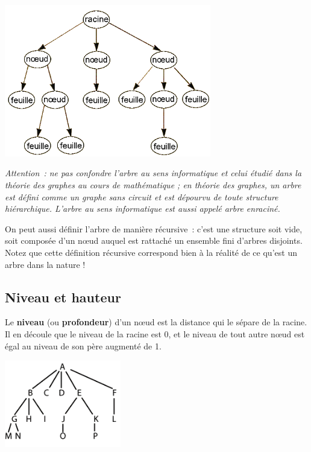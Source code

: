 		\begin{center}
		\includegraphics[width=9.036cm,height=6.636cm]{image/a2012Logique2eme-img029.png} 
		\end{center}
		
		\textit{Attention~: ne pas confondre l'arbre au sens informatique 
		et celui étudié dans la théorie des graphes au cours de mathématique ; 
		en théorie des graphes, un arbre est défini comme un graphe sans 
		circuit et est dépourvu de toute structure hiérarchique. L'arbre au sens
		informatique est aussi appelé arbre enraciné.}

		On peut aussi définir l'arbre de manière récursive~: 
		c'est une structure soit vide, soit composée d'un n{\oe}ud auquel
		est rattaché un ensemble fini d'arbres disjoints. 
		Notez que cette définition récursive correspond bien à la réalité de
		ce qu'est un arbre dans la nature !

	\subsection{Niveau et hauteur}

		Le \textbf{niveau} (ou \textbf{profondeur}) d'un n{\oe}ud 
		est la distance qui le sépare de la racine. Il en découle que
		le niveau de la racine est 0, et le niveau de tout autre 
		n{\oe}ud est égal au niveau de son père augmenté de 1.

		\begin{center}
		\includegraphics[width=5.092cm,height=3.819cm]{image/a2012Logique2eme-img030.png}
		\end{center}

